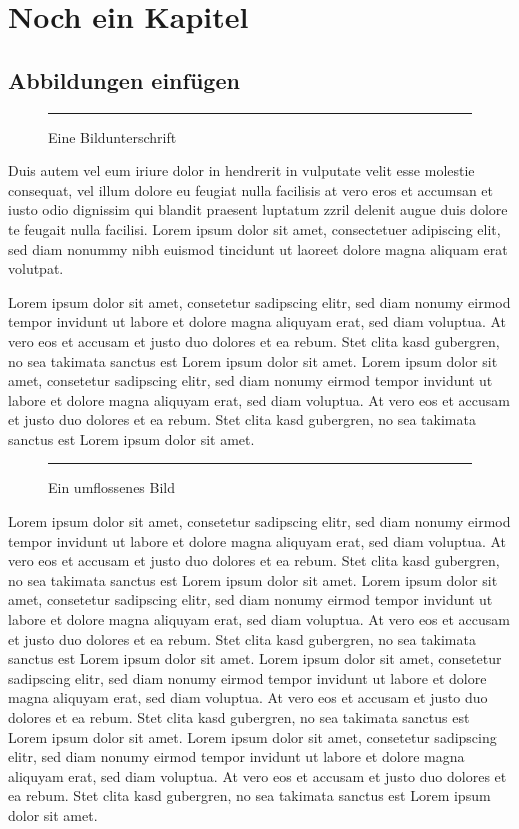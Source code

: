 \chapter{Noch ein Kapitel}

\section{Abbildungen einfügen}\label{sec:figures}

\begin{figure}[h]
\centering
\rule{10cm}{6.2cm}
\caption{Eine Bildunterschrift}\label{fig:somepicture}
\end{figure}

Duis autem vel eum iriure dolor in hendrerit in vulputate velit esse molestie consequat, vel illum dolore eu feugiat nulla facilisis at vero eros et accumsan et iusto odio dignissim qui blandit praesent luptatum zzril delenit augue duis dolore te feugait nulla facilisi. Lorem ipsum dolor sit amet, consectetuer adipiscing elit, sed diam nonummy nibh euismod tincidunt ut laoreet dolore magna aliquam erat volutpat.   

Lorem ipsum dolor sit amet, consetetur sadipscing elitr, sed diam nonumy eirmod tempor invidunt ut labore et dolore magna aliquyam erat, sed diam voluptua. At vero eos et accusam et justo duo dolores et ea rebum. Stet clita kasd gubergren, no sea takimata sanctus est Lorem ipsum dolor sit amet. Lorem ipsum dolor sit amet, consetetur sadipscing elitr, sed diam nonumy eirmod tempor invidunt ut labore et dolore magna aliquyam erat, sed diam voluptua. At vero eos et accusam et justo duo dolores et ea rebum. Stet clita kasd gubergren, no sea takimata sanctus est Lorem ipsum dolor sit amet.

\begin{wrapfigure}{r}{0.5\textwidth}
  \begin{center}
			\rule{7cm}{7cm}
  \end{center}
  \caption{Ein umflossenes Bild}
\end{wrapfigure}

Lorem ipsum dolor sit amet, consetetur sadipscing elitr, sed diam nonumy eirmod tempor invidunt ut labore et dolore magna aliquyam erat, sed diam voluptua. At vero eos et accusam et justo duo dolores et ea rebum. Stet clita kasd gubergren, no sea takimata sanctus est Lorem ipsum dolor sit amet. Lorem ipsum dolor sit amet, consetetur sadipscing elitr, sed diam nonumy eirmod tempor invidunt ut labore et dolore magna aliquyam erat, sed diam voluptua. At vero eos et accusam et justo duo dolores et ea rebum. Stet clita kasd gubergren, no sea takimata sanctus est Lorem ipsum dolor sit amet. Lorem ipsum dolor sit amet, consetetur sadipscing elitr, sed diam nonumy eirmod tempor invidunt ut labore et dolore magna aliquyam erat, sed diam voluptua. At vero eos et accusam et justo duo dolores et ea rebum. Stet clita kasd gubergren, no sea takimata sanctus est Lorem ipsum dolor sit amet. Lorem ipsum dolor sit amet, consetetur sadipscing elitr, sed diam nonumy eirmod tempor invidunt ut labore et dolore magna aliquyam erat, sed diam voluptua. At vero eos et accusam et justo duo dolores et ea rebum. Stet clita kasd gubergren, no sea takimata sanctus est Lorem ipsum dolor sit amet.

